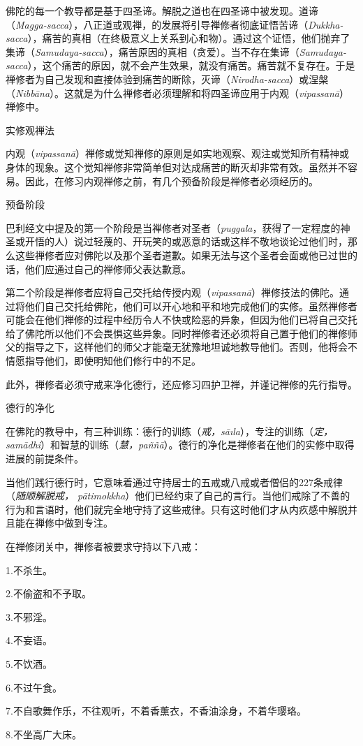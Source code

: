 佛陀的每一个教导都是基于四圣谛。解脱之道也在四圣谛中被发现。道谛（{\it Magga-sacca}），八正道或观禅，的发展将引导禅修者彻底证悟苦谛（{\it Dukkha-sacca}），痛苦的真相（在终极意义上关系到心和物）。通过这个证悟，他们抛弃了集谛（{\it Samudaya-sacca}），痛苦原因的真相（贪爱）。当不存在集谛（{\it Samudaya-sacca}），这个痛苦的原因，就不会产生效果，就没有痛苦。痛苦就不复存在。于是禅修者为自己发现和直接体验到痛苦的断除，灭谛（{\it Nirodha-sacca}）或涅槃（{\it Nibb\=ana}）。这就是为什么禅修者必须理解和将四圣谛应用于内观（{\it vipassan\=a}）禅修中。

\ssubsectnon 实修观禅法

内观（{\it vipassan\=a}）禅修或觉知禅修的原则是如实地观察、观注或觉知所有精神或身体的现象。这个觉知禅修非常简单\1但对达成痛苦的断灭却非常有效。虽然并不容易。因此，在修习内观禅修之前，有几个预备阶段是禅修者必须经历的。

\sssubsectnoni 预备阶段

巴利经文中提及的第一个阶段是当禅修者对圣者（{\it puggala}，获得了一定程度的神圣或开悟的人）说过轻蔑的、开玩笑的或恶意的话或这样不敬地谈论过他们时，那么这些禅修者应对佛陀以及那个圣者道歉。如果无法与这个圣者会面或他已过世的话，他们应通过自己的禅修师父表达歉意。

第二个阶段是禅修者应将自己交托给传授内观（{\it vipassan\=a}）禅修技法的佛陀。通过将他们自己交托给佛陀，他们可以开心地和平和地完成他们的实修。虽然禅修者可能会在他们禅修的过程中经历令人不快或险恶的异象，但因为他们已将自己交托给了佛陀所以他们不会畏惧这些异象。同时禅修者还必须将自己置于他们的禅修师父的指导之下，这样他们的师父才能毫无犹豫地坦诚地教导他们。否则，他将会不情愿指导他们，即使明知他们修行中的不足。

此外，禅修者必须守戒来净化德行，还应修习四护卫禅，并谨记禅修的先行指导。

\sssubsectnonb 德行的净化

在佛陀的教导中，有三种训练：德行的训练（{\it 戒，s\=a\i la}），专注的训练（{\it 定，sam\=adhi}）和智慧的训练\1（{\it 慧，pa\~n\~n\=a}）。德行的净化是禅修者在他们的实修中取得进展的前提条件。

当他们践行德行时，它意味着通过守持居士的五戒或八戒或者僧侣的227条戒律（{\it 随顺解脱戒， p\=atimokkha}）他们已经约束了自己的言行。当他们戒除了不善的行为和言语时，他们就完全地守持了这些戒律。只有这时他们才从内疚感中解脱并且能在禅修中做到专注。

在禅修闭关中，禅修者被要求守持以下八戒：

{
\leftskip=1.6pc
\item{1.}不杀生。
\item{2.}不偷盗和不予取。
\item{3.}不邪淫。
\item{4.}不妄语。
\item{5.}不饮酒。
\item{6.}不过午食。
\item{7.}不自歌舞作乐，不往观听，不着香薰衣，不香油涂身，不着华璎珞。
\item{8.}不坐高广大床。

}

